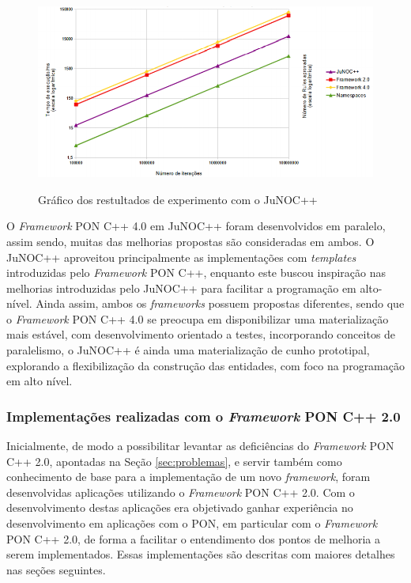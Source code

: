 \begin{figure}[!htb]
  \centering
  \caption{Gráfico dos restultados de experimento com o JuNOC++}
  \includegraphics[width=.85\textwidth]{../figures/junoc_graph.png}
  \label{fig:exp_junoc}
\end{figure}

O \textit{Framework} PON C++ 4.0 em JuNOC++ foram desenvolvidos em paralelo,
assim sendo, muitas das melhorias propostas são consideradas em ambos. O JuNOC++
aproveitou principalmente as implementações com \textit{templates} introduzidas
pelo \textit{Framework} PON C++, enquanto este buscou inspiração nas melhorias
introduzidas pelo JuNOC++ para facilitar a programação em alto-nível. Ainda
assim, ambos os \textit{frameworks} possuem propostas diferentes, sendo que o
\textit{Framework} PON C++ 4.0 se preocupa em disponibilizar uma materialização
mais estável, com desenvolvimento orientado a testes, incorporando conceitos de
paralelismo, o JuNOC++ é ainda uma materialização de cunho prototipal,
explorando a flexibilização da construção das entidades, com foco na programação
em alto nível.

\subsubsection{Implementações realizadas com o \textit{Framework} PON C++
  2.0}\label{sec:ex_fw2}

Inicialmente, de modo a possibilitar levantar as deficiências do
\textit{Framework} PON C++ 2.0, apontadas na Seção \ref{sec:problemas}, e servir
também como conhecimento de base para a implementação de um novo
\textit{framework}, foram desenvolvidas aplicações utilizando o
\textit{Framework} PON C++ 2.0. Com o desenvolvimento destas aplicações era
objetivado ganhar experiência no desenvolvimento em aplicações com o PON, em
particular com o \textit{Framework} PON C++ 2.0, de forma a facilitar o
entendimento dos pontos de melhoria a serem implementados. Essas implementações
são descritas com maiores detalhes nas seções seguintes.

